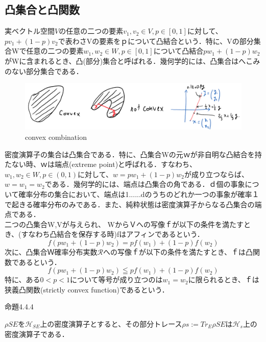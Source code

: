 \documentclass[xelatex,ja=standard,jafont=noto]{bxjsarticle}
\begin{document}
\newpage

\subsection{凸集合と凸関数}
実ベクトル空間$V$の任意の二つの要素$v_{1},v_{2}\in V,p\in [0,1]$に対して、$pv_{1}+(1-p)v_{2}$で表わさVの要素をｐについて凸結合という．特に、Vの部分集合Wで任意の二つの要素$w_{1},w_{2}\in W,p\in [0,1]$について凸結合$pw_{1}+(1-p)w_{2}$がWに含まれるとき、凸(部分)集合と呼ばれる．幾何学的には、凸集合はへこみのない部分集合である．\\

\begin{figure}[h!]
    \centering
    \includegraphics[scale=0.7]{1.png}
    \caption{convex combination}
\end{figure}
密度演算子の集合は凸集合である．特に、凸集合Wの元ｗが非自明な凸結合を持たない時、ｗは端点(extreme point)と呼ばれる．すなわち、$w_{1},w_{2}\in W,p\in(0,1)$に対して、$w=pw_{1}+(1-p)w_{2}$が成り立つならば、$w=w_{1}=w_{2}$である．幾何学的には、端点は凸集合の角である．ｄ個の事象について確率分布の集合において、端点は1......dのうちのどれか一つの事象が確率１で起きる確率分布のみである．また、純粋状態は密度演算子からなる凸集合の端点である．\\

二つの凸集合W,Vが与えられ、 WからＶへの写像ｆが以下の条件を満たすとき、(すなわち凸結合を保存する時)fはアフィンであるという．
\begin{equation}
    f(pw_{1}+(1-p)w_{2})=pf(w_{1})+(1-p)f(w_{2})
\end{equation}
次に、凸集合Ｗ確率分布実数$\mathcal{R}$への写像ｆが以下の条件を満たすとき、ｆは凸関数であるという．
\begin{equation}
    f(pw_{1}+(1-p)w_{2})\leqq pf(w_{1})+(1-p)f(w_{2})
\end{equation}
特に、ある$0<p<1$について等号が成り立つのは$w_{1}=w_{2}$に限られるとき、ｆは狭義凸関数(strictly convex function)であるという．\\

\newpage

命題4.4.4

    $\rho SE$を$\mathcal{H}_{SE}$上の密度演算子とすると、その部分トレース$\rho s:=Tr_{E}\rho SE$は$\mathcal{H}_{s}$上の密度演算子である．\\
    
\end{document}
